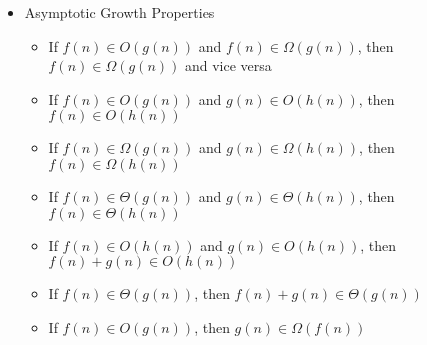 \documentclass{article}
\begin{document}
\begin{itemize}
    \item Asymptotic Growth Properties
        \begin{itemize}
            \item If $f(n) \in O(g(n))$ and $f(n) \in \Omega(g(n))$, then $f(n) \in \Omega(g(n))$ and vice versa
            \item If $f(n) \in O(g(n))$ and $g(n) \in O(h(n))$, then $f(n) \in O(h(n))$
            \item If $f(n) \in \Omega(g(n))$ and $g(n) \in \Omega(h(n))$, then $f(n) \in \Omega(h(n))$
            \item If $f(n) \in \Theta(g(n))$ and $g(n) \in \Theta(h(n))$, then $f(n) \in \Theta(h(n))$
            \item If $f(n) \in O(h(n))$ and $g(n) \in O(h(n))$, then $f(n) + g(n) \in O(h(n))$
            \item If $f(n) \in \Theta(g(n))$, then $f(n) + g(n) \in \Theta(g(n))$
            \item If $f(n) \in O(g(n))$, then $g(n) \in \Omega(f(n))$
        \end{itemize}
\end{itemize}
\end{document}
